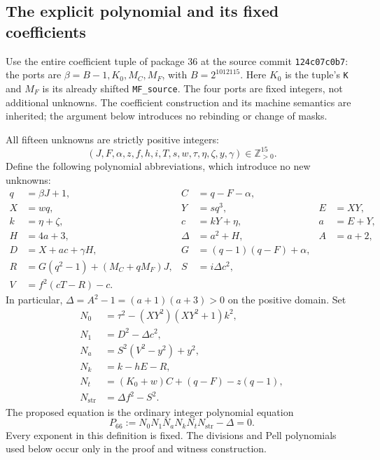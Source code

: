 \documentclass[11pt,letterpaper]{article}
\theoremstyle{remark}\newtheorem{remark}[theorem]{Remark}
\newcommand{\Pos}{\mathbb Z_{>0}}
\begin{document}
\subsection{The explicit polynomial and its fixed coefficients}

Use the entire coefficient tuple of package 36 at the source commit
\texttt{124c07c0b7}: the ports are
\(\beta=B-1,K_0,M_C,M_F\), with \(B=2^{1012115}\).
Here \(K_0\) is the tuple's \texttt{K} and \(M_F\) is its already shifted
\texttt{MF\_source}.  The four ports are fixed integers, not additional
unknowns.  The coefficient construction and its machine semantics are
inherited; the argument below introduces no rebinding or change of masks.

All fifteen unknowns are strictly positive integers:
\[
 (J,F,\alpha,z,f,h,i,T,s,w,\tau,\eta,\zeta,y,\gamma)\in\Pos^{15}.
\]
Define the following polynomial abbreviations, which introduce no new
unknowns:
\begin{align*}
 q&=\beta J+1,                 & C&=q-F-\alpha,\\
 X&=wq,                       & Y&=sq^3, & E&=XY,\\
 k&=\eta+\zeta,               & c&=kY+\eta, & a&=E+Y,\\
 H&=4a+3,                     & \Delta&=a^2+H, & A&=a+2,\\
 D&=X+ac+\gamma H,            & G&=(q-1)(q-F)+\alpha,\\
 R&=G(q^2-1)+(M_C+qM_F)J,     & S&=i\Delta c^2,\\
 V&=f^2(cT-R)-c.&&&
\end{align*}
In particular, \(\Delta=A^2-1=(a+1)(a+3)>0\) on the positive domain.
Set
\begin{align*}
 N_0&=\tau^2-(XY^2)(XY^2+1)k^2,\\
 N_1&=D^2-\Delta c^2,\\
 N_a&=S^2(V^2-y^2)+y^2,\\
 N_k&=k-hE-R,\\
 N_t&=(K_0+w)C+(q-F)-z(q-1),\\
 N_{\mathrm{str}}&=\Delta f^2-S^2.
\end{align*}
The proposed equation is the ordinary integer polynomial equation
\begin{equation}
 \boxed{\quad
 P_{66}:=N_0N_1N_aN_kN_tN_{\mathrm{str}}-\Delta=0.
 \quad}
 \label{eq:p66}
\end{equation}
Every exponent in this definition is fixed.  The divisions and Pell
polynomials used below occur only in the proof and witness construction.
\end{document}
